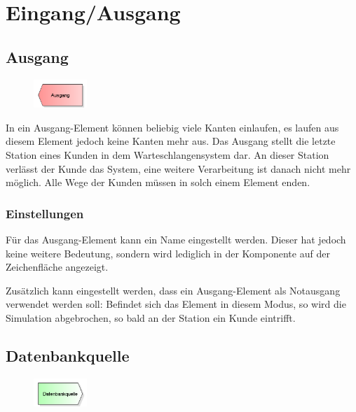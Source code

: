 \chapter{Eingang/Ausgang}

\renewcommand{\thepage}{\arabic{page}}
\setcounter{page}{1}

\section{Ausgang}
\label{ref:ModelElementDispose}

\begin{figure}
\vspace{-22pt}
\includegraphics[width=2cm]{imageModelElementDispose.png}
\vspace{-22pt}
\end{figure}

In ein Ausgang-Element können beliebig viele Kanten einlaufen, es laufen aus diesem Element jedoch keine Kanten mehr aus.
Das Ausgang stellt die letzte Station eines Kunden in dem Warteschlangensystem dar. An dieser Station verlässt der Kunde
das System, eine weitere Verarbeitung ist danach nicht mehr möglich. Alle Wege der Kunden müssen in solch einem Element enden.

\subsection*{Einstellungen}

Für das Ausgang-Element kann ein Name eingestellt werden. Dieser hat jedoch keine weitere Bedeutung, sondern wird lediglich
in der Komponente auf der Zeichenfläche angezeigt.

Zusätzlich kann eingestellt werden, dass ein Ausgang-Element als Notausgang verwendet werden soll: Befindet sich das Element
in diesem Modus, so wird die Simulation abgebrochen, so bald an der Station ein Kunde eintrifft.


\section{Datenbankquelle}
\label{ref:ModelElementSourceDB}

\begin{figure}
\vspace{-22pt}
\includegraphics[width=2cm]{imageModelElementSourceDB.png}
\vspace{-22pt}
\end{figure}

